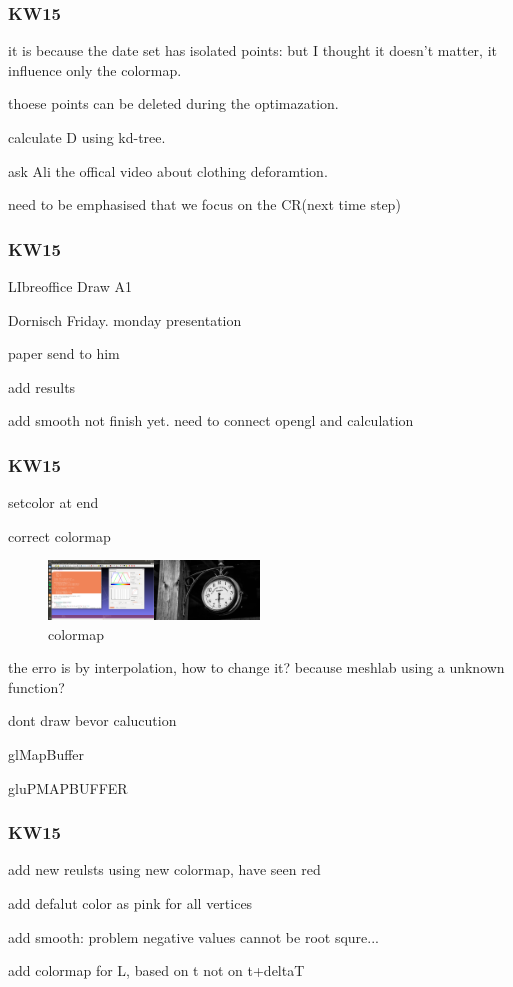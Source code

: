 \documentclass{beamer}
\begin{document}

\begin{frame}
\frametitle{KW15}
it is because the date set has isolated points: but I thought it doesn't matter, it influence only the colormap.

thoese points can be deleted during the optimazation.

calculate D using kd-tree.

ask Ali the offical video about clothing deforamtion.

need to be emphasised that we focus on the CR(next time step)
\end{frame}

\begin{frame}
\frametitle{KW15}
LIbreoffice Draw A1

Dornisch Friday. monday presentation

paper send to him

add results

add smooth not finish yet. need to connect opengl and calculation
\end{frame}

\begin{frame}
\frametitle{KW15}
setcolor at end

correct colormap 
\begin{figure}
\centering
\includegraphics[width=0.5\textwidth]{image//colormap_error.png}
\caption{colormap}
\end{figure}
the erro is by interpolation, how to change it? because meshlab using a unknown function?

dont draw bevor calucution

glMapBuffer

gluPMAPBUFFER
\end{frame}

\begin{frame}
\frametitle{KW15}
add new reulsts using new colormap, have seen red

add defalut color as pink for all vertices

add smooth: problem negative values cannot be root squre...

add colormap for L, based on t not on t+deltaT
\end{frame}
\end{document}
